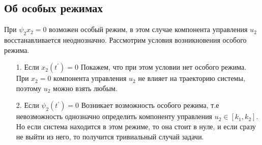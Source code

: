 \documentclass[11pt]{article}
\begin{document}
	
	\subsection{Об особых режимах}
	{При $\psi_2x_2 =0$ возможен особый режим, в этом случае компонента управления $u_2$ восстанавливается неоднозначно. Рассмотрим условия возникновения особого режима.}
	\begin{itemize}
		\item [1.]{Если $x_2(t^{'})= 0$
	\newline
	Покажем, что при этом условии нет особого режима. При $x_2 = 0$ компонента управления $u_2$ не влияет на траекторию системы, поэтому $u_2$ можно взять любым.	
	}
		\item [2.]{Если $\psi_2(t^{'}) = 0$
	\newline
	Возникает возможность особого режима, т.е невозможность однозначно определить компоненту управления $u_2 \in [k_1,k_2].$ Но если система находится в этом режиме, то она стоит в нуле, и если сразу не выйти из него, то получится тривиальный случай задачи.	
	}
	\end{itemize}
\end{document}
